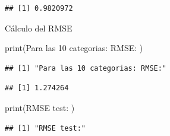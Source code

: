 \documentclass[
]{article}
\newenvironment{Shaded}{\begin{snugshade}}{\end{snugshade}}
\newcommand{\DecValTok}[1]{\textcolor[rgb]{0.00,0.00,0.81}{#1}}
\newcommand{\FunctionTok}[1]{\textcolor[rgb]{0.00,0.00,0.00}{#1}}
\newcommand{\NormalTok}[1]{#1}
\newcommand{\SpecialCharTok}[1]{\textcolor[rgb]{0.00,0.00,0.00}{#1}}
\newcommand{\StringTok}[1]{\textcolor[rgb]{0.31,0.60,0.02}{#1}}
\begin{document}
\begin{verbatim}
## [1] 0.9820972
\end{verbatim}

Cálculo del RMSE

\begin{Shaded}
\begin{Highlighting}[]
\FunctionTok{print}\NormalTok{(}\StringTok{\textquotesingle{}Para las 10 categorias: RMSE:\textquotesingle{}}\NormalTok{ )}
\end{Highlighting}
\end{Shaded}

\begin{verbatim}
## [1] "Para las 10 categorias: RMSE:"
\end{verbatim}

\begin{Shaded}
\end{Shaded}

\begin{verbatim}
## [1] 1.274264
\end{verbatim}

\begin{Shaded}
\begin{Highlighting}[]
\FunctionTok{print}\NormalTok{(}\StringTok{\textquotesingle{}RMSE test:\textquotesingle{}}\NormalTok{ )}
\end{Highlighting}
\end{Shaded}

\begin{verbatim}
## [1] "RMSE test:"
\end{verbatim}

\begin{Shaded}
\end{Shaded}
\end{document}
